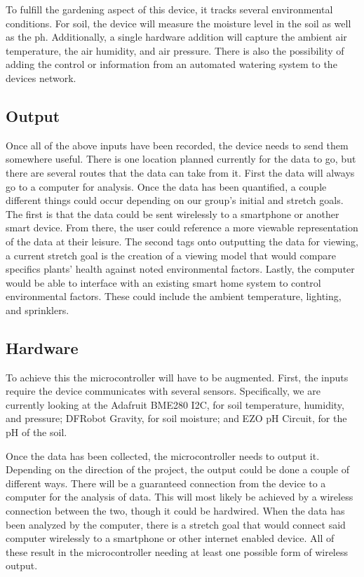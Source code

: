 \documentclass[IEEEtran,letterpaper,10pt,titlepage,fleqn,draftclsnofoot,onecolumn]{article}
\begin{document}
To fulfill the gardening aspect of this device, it tracks several environmental conditions. For soil, the device will measure the moisture level in the soil as well as the ph. Additionally, a single hardware addition will capture the ambient air temperature, the air humidity, and air pressure. There is also the possibility of adding the control or information from an automated watering system to the devices network.

\subsection{Output}

Once all of the above inputs have been recorded, the device needs to send them somewhere useful. There is one location planned currently for the data to go, but there are several routes that the data can take from it. First the data will always go to a computer for analysis. Once the data has been quantified, a couple different things could occur depending on our group’s initial and stretch goals. The first is that the data could be sent wirelessly to a smartphone or another smart device. From there, the user could reference a more viewable representation of the data at their leisure. The second tags onto outputting the data for viewing, a current stretch goal is the creation of a viewing model that would compare specifics plants’ health against noted environmental factors. Lastly, the computer would be able to interface with an existing smart home system to control environmental factors. These could include the ambient temperature, lighting, and sprinklers.

\clearpage

\subsection{Hardware}

To achieve this the microcontroller will have to be augmented. First, the inputs require the device communicates with several sensors. Specifically, we are currently looking at the Adafruit BME280 I2C, for soil temperature, humidity, and pressure; DFRobot Gravity, for soil moisture; and EZO pH Circuit, for the pH of the soil.

\vspace{5mm}

Once the data has been collected, the microcontroller needs to output it. Depending on the direction of the project, the output could be done a couple of different ways. There will be a guaranteed connection from the device to a computer for the analysis of data. This will most likely be achieved by a wireless connection between the two, though it could be hardwired. When the data has been analyzed by the computer, there is a stretch goal that would connect said computer wirelessly to a smartphone or other internet enabled device. All of these result in the microcontroller needing at least one possible form of wireless output.
\end{document}
